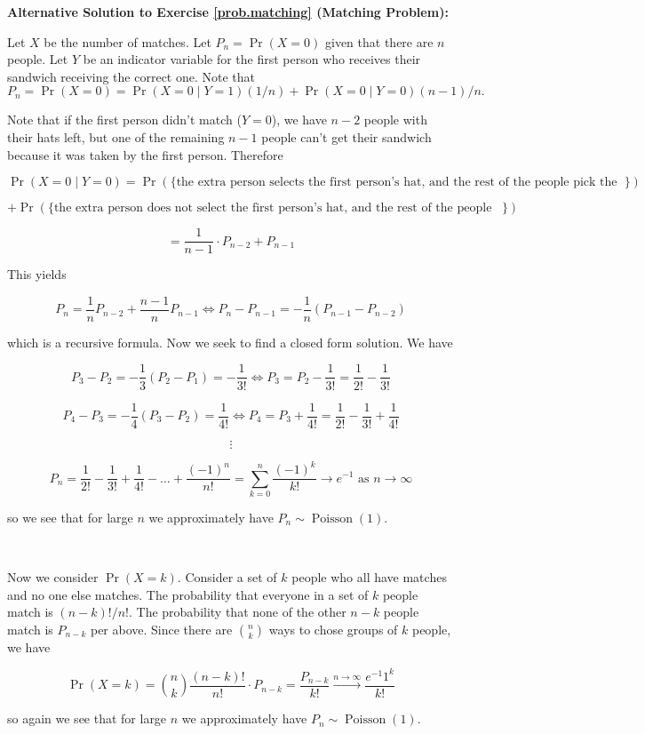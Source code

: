 \begin{solution} \textbf{Alternative Solution to Exercise \ref {prob.matching} (Matching Problem):} 

Let \(X\) be the number of matches. Let \(P_n = \Pr(X=0)\) given that there are \(n\) people. Let \(Y\) be an indicator variable for the first person who receives their sandwich receiving the correct one. Note that 
\[ P_n = \Pr(X=0) = \Pr(X=0 \mid Y =1) (1/n) + \Pr(X=0 \mid Y=0) (n-1)/n .
\]

Note that if the first person didn't match (\(Y=0\)), we have \(n-2\) people with their hats left, but one of the remaining \(n-1\) people can't get their sandwich because it was taken by the first person. Therefore

\[
\Pr(X=0 \mid Y=0) = \Pr(\{\text{the extra person selects the first person's hat, and the rest of the people pick the wrong hat}\}) 
\]

\[
+ \Pr(\{\text{the extra person does not select the first person's hat, and the rest of the people don't have any matches}\})
\]

\[
= \frac{1}{n-1} \cdot P_{n-2} + P_{n-1}
\]

This yields

\[
P_n = \frac{1}{n} P_{n-2} + \frac{n-1}{n} P_{n-1} \iff P_n - P_{n-1} = - \frac{1}{n}(P_{n-1} - P_{n-2})
\]

which is a recursive formula. Now we seek to find a closed form solution. We have

\[
P_3 - P_2 = - \frac{1}{3} (P_2 - P_1) = - \frac{1}{3!} \iff P_3 = P_2 - \frac{1}{3!} = \frac{1}{2!} - \frac{1}{3!}
\]

\[
P_4 - P_3 = - \frac{1}{4}(P_3 - P_2) = \frac{1}{4!} \iff P_4 = P_3 + \frac{1}{4!} = \frac{1}{2!} - \frac{1}{3!} + \frac{1}{4!}
\]

\[
\vdots
\]

\[
P_n = \frac{1}{2!} - \frac{1}{3!} + \frac{1}{4!} - \ldots + \frac{(-1)^n}{n!} = \sum_{k=0}^n \frac{(-1)^k}{k!} \rightarrow e^{-1} \text{ as } n \to \infty
\]

so we see that for large \(n\) we approximately have \(P_n \sim \operatorname{Poisson}(1)\).

\

Now we consider \(\Pr(X=k)\). Consider a set of \(k\) people who all have matches and no one else matches. The probability that everyone in a set of \(k\) people match is \((n-k)!/n!\). The probability that none of the other \(n-k\) people match is \(P_{n-k}\) per above. Since there are \(\binom{n}{k}\) ways to chose groups of \(k\) people, we have

\[
\Pr(X=k) = \binom{n}{k} \frac{(n-k)!}{n!} \cdot P_{n-k} = \frac{P_{n-k}}{k!} \xrightarrow{n \to \infty} \frac{e^{-1}1^k}{k!}
\]

so again we see that for large \(n\) we approximately have \(P_n \sim \operatorname{Poisson}(1)\).

\end{solution}

